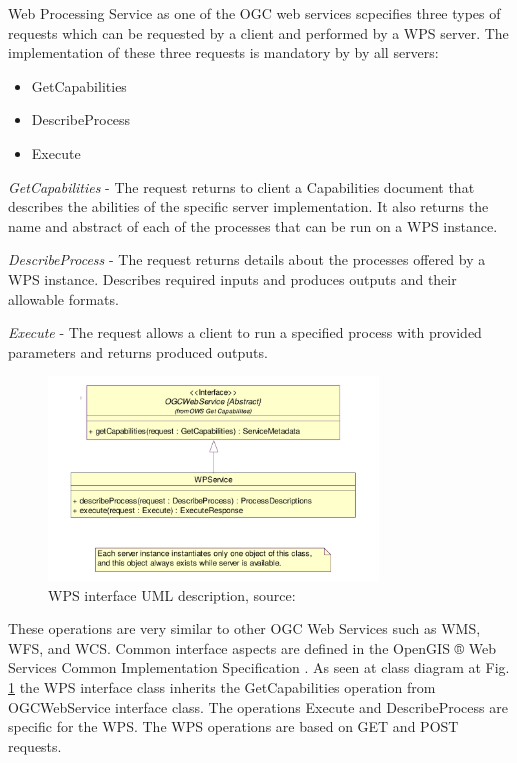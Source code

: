 \documentclass[12pt,a4paper]{article}
\begin{document}
\bigskip
Web Processing Service as one of the OGC web services scpecifies three types of requests which can be requested
by a client and performed by a WPS server. The implementation of these three requests is mandatory by by all servers:
\begin{itemize}
\item{GetCapabilities}
\item{DescribeProcess}
\item{Execute}
\end{itemize}

\textit{GetCapabilities} - The request returns to client a Capabilities document that describes the abilities
of the specific server implementation. It also returns the name and abstract of each of the processes that can
be run on a WPS instance.

\textit{DescribeProcess} - The request returns details about the processes offered by a WPS instance. Describes
required inputs and produces outputs and their allowable formats.

\textit{Execute} - The request allows a client to run a specified process with provided parameters and returns
produced outputs.

\begin{figure}[h!]
\centering
\includegraphics[width=0.78\textwidth]{img/WPS_class_diagram.png}
\caption{WPS interface UML description, source: \cite{WPS_standart_1.0}}
\label{fig:WPS_class_diagram}
\end{figure}

These operations are very similar to other OGC Web Services such as WMS, WFS, and WCS. Common interface aspects
are defined in the OpenGIS ® Web Services Common Implementation Specification \cite{OGC_common}. As seen at 
class diagram at Fig. \ref{fig:WPS_class_diagram} the WPS interface class inherits the GetCapabilities operation 
from OGCWebService interface class. The operations Execute and DescribeProcess are specific for the WPS. The WPS
operations are based on GET and POST requests.
\end{document}
